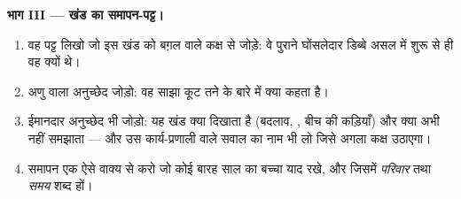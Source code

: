 \begin{problem}[{सप्ताहांत समस्या --- सबूतों का कक्ष
सजाना}]
\medskip\noindent\textbf{भाग III --- खंड का समापन-पट्ट।}
\begin{enumerate}[resume]
  \item वह पट्ट लिखो जो इस खंड को बग़ल वाले  कक्ष से जोड़े:
        वे पुराने घोंसलेदार डिब्बे असल में शुरू से ही वह  क्यों
        थे।
  \item अणु वाला अनुच्छेद जोड़ो: वह साझा कूट तने के बारे में क्या कहता
        है।
  \item ईमानदार अनुच्छेद भी जोड़ो: यह खंड क्या दिखाता है (बदलाव,
        , बीच की कड़ियाँ) और क्या अभी नहीं समझाता --- और उस
        कार्य-प्रणाली वाले सवाल का नाम भी लो जिसे अगला कक्ष उठाएगा।
  \item समापन एक ऐसे वाक्य से करो जो कोई बारह साल का बच्चा याद रखे, और
        जिसमें \emph{परिवार} तथा \emph{समय} शब्द हों।
\end{enumerate}
\end{problem}
